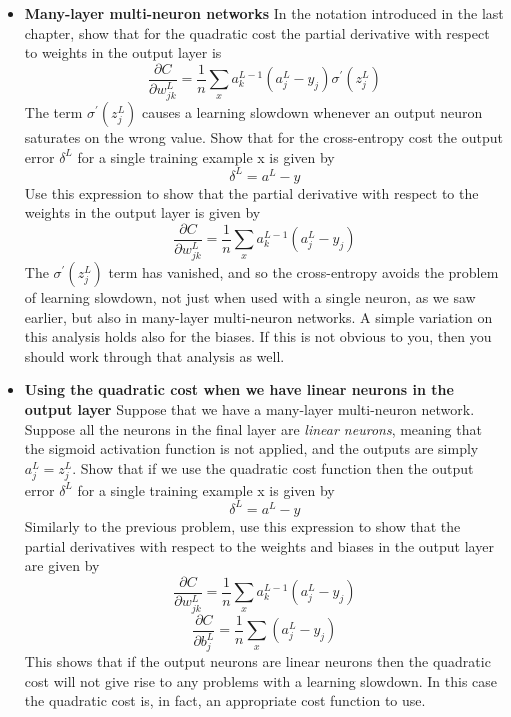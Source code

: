 \begin{itemize}

\item \textbf{Many-layer multi-neuron networks} In the notation introduced in the last chapter, show that for the quadratic cost the partial derivative with respect to weights in the output layer is 
\begin{equation}
\frac{\partial C}{\partial w_{j k}^{L}}=\frac{1}{n} \sum_{x} a_{k}^{L-1}\left(a_{j}^{L}-y_{j}\right) \sigma^{\prime}\left(z_{j}^{L}\right)
\label{eq:c03-65}
\end{equation}
The term $\sigma^{\prime}\left(z_{j}^{L}\right)$ causes a learning slowdown whenever an output neuron saturates on the wrong value. Show that for the cross-entropy cost the output error  $\delta^{L}$ for a single training example x is given by 
\begin{equation}
\delta^{L}=a^{L}-y
\label{eq:c03-66}
\end{equation}
Use this expression to show that the partial derivative with respect to the weights in the output layer is given by 
\begin{equation}
\frac{\partial C}{\partial w_{j k}^{L}}=\frac{1}{n} \sum_{x} a_{k}^{L-1}\left(a_{j}^{L}-y_{j}\right)
\label{eq:c03-67}
\end{equation}
The $\sigma^{\prime}\left(z_{j}^{L}\right)$ term has vanished, and so the cross-entropy avoids the problem of learning slowdown, not just when used with a single neuron, as we saw earlier, but also in many-layer multi-neuron networks. A simple variation on this analysis holds also for the biases. If this is not obvious to you, then you should work through that analysis as well.

\item \textbf{Using the quadratic cost when we have linear neurons in the output layer} Suppose that we have a many-layer multi-neuron network. Suppose all the neurons in the final layer are \textit{linear neurons}, meaning that the sigmoid activation function is not applied, and the outputs are simply $a_{j}^{L}=z_{j}^{L}$. Show that if we use the quadratic cost function then the output error  $\delta^{L}$ for a single training example x is given by 
\begin{equation}
\delta^{L}=a^{L}-y
\label{eq:c03-68}
\end{equation}
Similarly to the previous problem, use this expression to show that the partial derivatives with respect to the weights and biases in the output layer are given by 
\begin{equation}
\frac{\partial C}{\partial w_{j k}^{L}}=\frac{1}{n} \sum_{x} a_{k}^{L-1}\left(a_{j}^{L}-y_{j}\right)
\label{eq:c03-69}
\end{equation}
\begin{equation}
\frac{\partial C}{\partial b_{j}^{L}}=\frac{1}{n} \sum_{x}\left(a_{j}^{L}-y_{j}\right)
\label{eq:c03-70}
\end{equation}
This shows that if the output neurons are linear neurons then the quadratic cost will not give rise to any problems with a learning slowdown. In this case the quadratic cost is, in fact, an appropriate cost function to use. 
\end{itemize}


